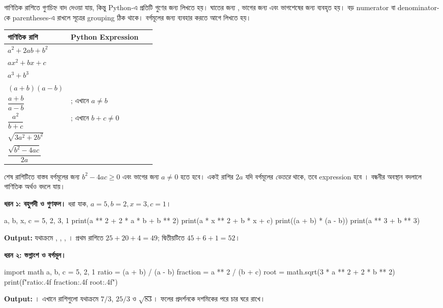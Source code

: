 
গাণিতিক রাশিতে গুণচিহ্ন বাদ দেওয়া যায়, কিন্তু Python-এ প্রতিটি গুণের জন্য
\py{*} লিখতে হয়। ঘাতের জন্য \py{**}, ভাগের জন্য \py{/} এবং ভাগশেষের
জন্য \py{\%} ব্যবহৃত হয়। বড় numerator বা denominator-কে parentheses-এ
রাখলে সূত্রের grouping ঠিক থাকে। বর্গমূলের জন্য  ব্যবহার
করতে আগে  লিখতে হয়।

\begin{tabularx}{\linewidth}{|p{0.34\linewidth}|Y|}
\hline
{}\textbf{গাণিতিক রাশি} & \textbf{Python Expression}\\\hline
\(a^2+2ab+b^2\) & \\\hline
\(ax^2+bx+c\) & \\\hline
\(a^3+b^3\) & \\\hline
\((a+b)(a-b)\) & \\\hline
\(\dfrac{a+b}{a-b}\) & ; এখানে \(a\ne b\)\\\hline
\(\dfrac{a^2}{b+c}\) & ; এখানে \(b+c\ne0\)\\\hline
\(\sqrt{3a^2+2b^2}\) & \\\hline
\(\dfrac{\sqrt{b^2-4ac}}{2a}\) & \\\hline
\end{tabularx}

শেষ রাশিটিতে বাস্তব বর্গমূলের জন্য \(b^2-4ac\ge0\) এবং ভাগের জন্য
\(a\ne0\) হতে হবে। একই রাশির \(2a\) যদি বর্গমূলের \emph{ভেতরে} থাকে,
তবে expression হবে ।
বন্ধনীর অবস্থান বদলালে গাণিতিক অর্থও বদলে যায়।

\textbf{ধরন ১: বহুপদী ও গুণফল।} ধরা যাক, \(a=5,b=2,x=3,c=1\)।
\begin{pythoncode}
a, b, x, c = 5, 2, 3, 1
print(a ** 2 + 2 * a * b + b ** 2)
print(a * x ** 2 + b * x + c)
print((a + b) * (a - b))
print(a ** 3 + b ** 3)
\end{pythoncode}
\textbf{Output:} যথাক্রমে , , , ।
প্রথম রাশিতে \(25+20+4=49\); দ্বিতীয়টিতে \(45+6+1=52\)।

\textbf{ধরন ২: ভগ্নাংশ ও বর্গমূল।}
\begin{pythoncode}
import math
a, b, c = 5, 2, 1
ratio = (a + b) / (a - b)
fraction = a ** 2 / (b + c)
root = math.sqrt(3 * a ** 2 + 2 * b ** 2)
print(f"{ratio:.4f} {fraction:.4f} {root:.4f}")
\end{pythoncode}
\textbf{Output:} ।
এখানে রাশিগুলো যথাক্রমে \(7/3\), \(25/3\) ও \(\sqrt{83}\)।
 ফলের প্রদর্শনকে দশমিকের পরে চার ঘরে রাখে।

